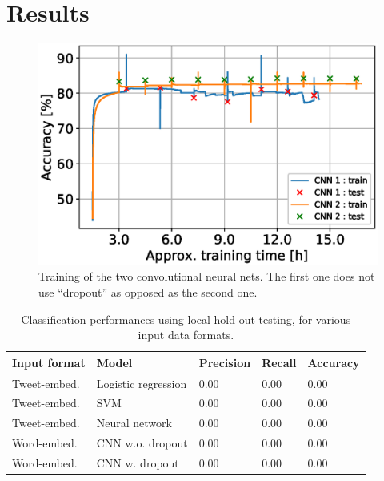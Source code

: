 \section{Results}
\label{sec:results}
\begin{figure}[h!]
\centering
	\includegraphics[scale=0.6]{CNNaccuracy} 
\caption{Training of the two convolutional neural nets. The first one does not use ``dropout'' as opposed as the second one.}
\label{plot:CNNaccuracy}
\end{figure}
\FloatBarrier


\begin{table}[h]
  \centering
  \begin{tabular}[c]{lllll}
    Input format&Model&Precision&Recall&Accuracy\\
    \hline
    Tweet-embed.&Logistic regression & 0.00       & 0.00  & 0.00 \\
    Tweet-embed.&SVM                 & 0.00       & 0.00  & 0.00 \\
    Tweet-embed.&Neural network	& 0.00	& 0.00	&	0.00 \\
    Word-embed.&CNN w.o. dropout                & 0.00	& 0.00	&	0.00 \\
    Word-embed.&CNN w. dropout & 0.00 & 0.00 & 0.00
    
  \end{tabular}
  \caption{Classification performances using local hold-out testing, for various input data formats.}
  \label{tab:results}
\end{table}


